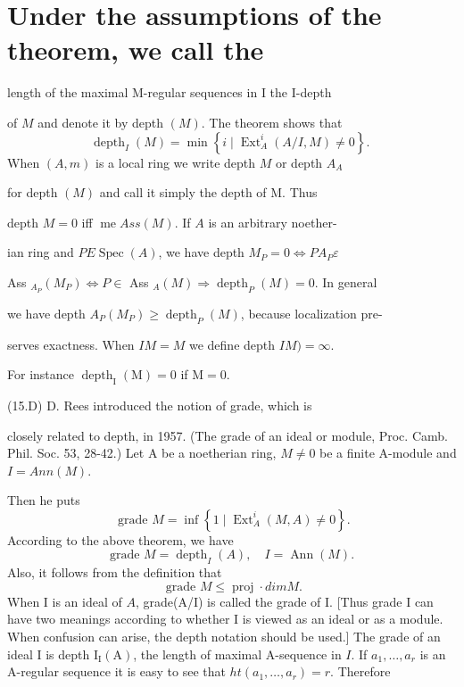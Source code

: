 \section{Under the assumptions of the theorem, we call the}
length of the maximal M-regular sequences in I the I-depth

of $M$ and denote it by depth $(M)$. The theorem shows that
$$
\operatorname{depth}_{I}(M)=\min \left\{i \mid \operatorname{Ext}_{A}^{i}(A / I, M) \neq 0\right\} \text {. }
$$
When $(A, m)$ is a local ring we write depth $M$ or depth $A_{A}$

for depth $(M)$ and call it simply the depth of M. Thus

depth $M=0$ iff $\operatorname{me} A s s(M)$. If $A$ is an arbitrary noether-

ian ring and $P E \operatorname{Spec}(A)$, we have depth $M_{P}=0 \Leftrightarrow P A_{P} \varepsilon$

Ass $_{A_{P}}\left(M_{P}\right) \Leftrightarrow P \in$ Ass $_{A}(M) \Rightarrow \operatorname{depth}_{P}(M)=0$. In general

we have depth $A_{P}\left(M_{P}\right) \geqslant \operatorname{depth}_{P}(M)$, because localization pre-

serves exactness. When $I M=M$ we define depth $I M)=\infty$.

For instance $\operatorname{depth}_{\mathrm{I}}(\mathrm{M})=0$ if $\mathrm{M}=0$.

(15.D) D. Rees introduced the notion of grade, which is

closely related to depth, in 1957. (The grade of an ideal or module, Proc. Camb. Phil. Soc. 53, 28-42.) Let A be a noetherian ring, $M \neq 0$ be a finite A-module and $I=A n n(M)$.

Then he puts
$$
\text { grade } M=\inf \left\{1 \mid \operatorname{Ext}_{A}^{i}(M, A) \neq 0\right\} .
$$
According to the above theorem, we have
$$
\text { grade } M=\operatorname{depth}_{I}(A), \quad I=\operatorname{Ann}(M) \text {. }
$$
Also, it follows from the definition that
$$
\text { grade } M \leqslant \operatorname{proj} \cdot d i m M .
$$
When I is an ideal of $A$, grade(A/I) is called the grade of I. [Thus grade I can have two meanings according to whether I is viewed as an ideal or as a module. When confusion can arise, the depth notation should be used.] The grade of an ideal I is depth $\mathrm{I}_{\mathrm{I}}(\mathrm{A})$, the length of maximal A-sequence in $I$. If $a_{1}, \ldots, a_{r}$ is an A-regular sequence it is easy to see that $h t\left(a_{1}, \ldots, a_{r}\right)=r$. Therefore

